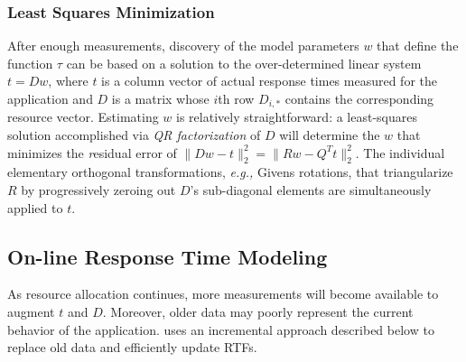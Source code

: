 \subsubsection*{Least Squares Minimization}
After enough measurements, discovery of the model parameters $w$ that define the function $\tau$
can be based on a solution to the over-determined linear system $t=Dw$,
where $t$ is a column vector of actual response times measured for the application
and $D$ is a matrix whose $i$th row $D_{i,*}$ contains the corresponding resource vector.
Estimating $w$ is relatively straightforward: a least-squares solution accomplished via
\emph{QR factorization}\cite{GoVL} of $D$ will determine the $w$ that minimizes the \emph residual error of
$\|Dw - t\|^2_2 =  \|Rw - Q^Tt\|^2_2$.
%
The individual elementary orthogonal transformations, \emph{e.g.,} Givens rotations,
that triangularize $R$ by progressively zeroing out $D$'s sub-diagonal elements are simultaneously applied to $t$.


\subsection{On-line Response Time Modeling}
As resource allocation continues, more measurements will become available to augment $t$ and $D$.
Moreover, older data may poorly represent the current behavior of the application.
\pacora uses an incremental approach described below to replace old data and efficiently update RTFs.

